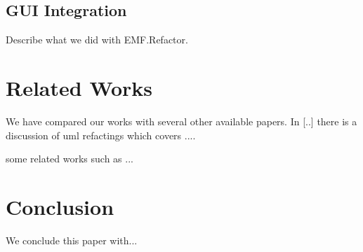 \documentclass{llncs}
\begin{document}
\subsection{GUI Integration}
Describe what we did with EMF.Refactor.

\section{Related Works}
We have compared our works with several other available papers. In [..] there is a discussion of uml refactings which covers ....

some related works such as ... 

\cite{rob99}

\section{Conclusion}
We conclude this paper with...



\end{document}
